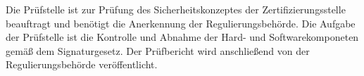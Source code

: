 Die Prüfstelle ist zur Prüfung des Sicherheitskonzeptes der Zertifizierungsstelle beauftragt und benötigt die Anerkennung der Regulierungsbehörde. Die Aufgabe der Prüfstelle ist die Kontrolle und Abnahme der Hard- und Softwarekomponeten gemäß dem Signaturgesetz. Der Prüfbericht wird anschließend von der Regulierungsbehörde veröffentlicht. \cite{standdeswissens3}